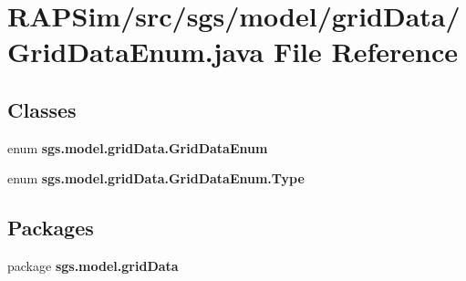 \section{R\-A\-P\-Sim/src/sgs/model/grid\-Data/\-Grid\-Data\-Enum.java File Reference}
\label{_grid_data_enum_8java}
\subsection*{Classes}
\begin{DoxyCompactItemize}
\item 
enum {\bf sgs.\-model.\-grid\-Data.\-Grid\-Data\-Enum}
\item 
enum {\bf sgs.\-model.\-grid\-Data.\-Grid\-Data\-Enum.\-Type}
\end{DoxyCompactItemize}
\subsection*{Packages}
\begin{DoxyCompactItemize}
\item 
package {\bf sgs.\-model.\-grid\-Data}
\end{DoxyCompactItemize}
